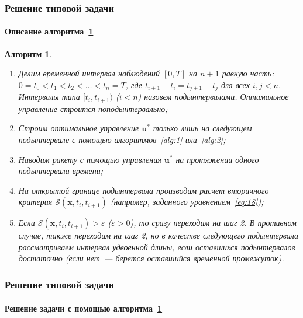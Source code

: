\documentclass[ignorenonframetext,hyperref={pdftex,unicode,pdfpagelabels=false},compress]{beamer}
\newtheorem{alg}{Алгоритм}
\begin{document}
\begin{frame}
	\frametitle{Решение типовой задачи}
	\framesubtitle{Описание алгоритма~\ref{alg:4}}\footnotesize
    
    \begin{alg}\label{alg:4}~
        \begin{enumerate}
            \item
                Делим временной интервал наблюдений $[0, T]$ на $n+1$ равную часть: $0 = t_0 < t_1 < t_2 < \ldots < t_{n} = T$, где $t_{i+1}-t_i = t_{j+1}-t_j$ для всех $i, j < n$. Интервалы типа $[t_i, t_{i+1})$ ($i<n$) назовем подынтервалами. Оптимальное управление строится поподынтервально;

            \item
                Строим оптимальное управление $\mathbf{u}^*$ только лишь на следующем подынтервале с помощью алгоритмов~\ref{alg:1} или~\ref{alg:2};

            \item
                Наводим ракету с помощью управления $\mathbf{u}^*$ на протяжении одного подынтервала времени;

            \item
                На открытой границе подынтервала производим расчет вторичного критерия $\mathscr{S}(\mathbf{x}, t_i, t_{i+1})$ (например, заданного уравнением~\ref{eq:18});

            \item
                Если $\mathscr{S}(\mathbf{x}, t_i, t_{i+1}) > \varepsilon$ ($\varepsilon > 0$), то сразу переходим на шаг 2. В противном случае, также переходим на шаг 2, но в качестве следующего подынтервала рассматриваем интервал удвоенной длины, если оставшихся подынтервалов достаточно (если нет~--- берется оставшийся временной промежуток).
        \end{enumerate}
    \end{alg}
\end{frame}



\begin{frame}
	\frametitle{Решение типовой задачи}
	\framesubtitle{Решение задачи с помощью алгоритма~\ref{alg:4}}
    
    \begin{figure}\center
        
        \label{fig:alg4}
    \end{figure}
\end{frame}
\end{document}

